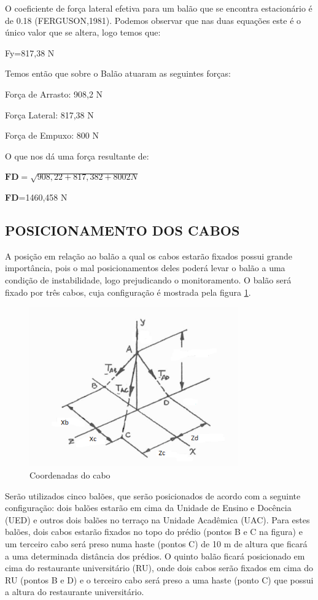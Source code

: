 	O coeficiente de força lateral efetiva para um balão que se encontra estacionário é de 0.18 (FERGUSON,1981). Podemos observar que nas duas equações este é o único valor que se altera, logo temos que:

	Fy=817,38 N

	Temos então que sobre o Balão atuaram as seguintes forças:

	Força de Arrasto: 908,2 N

	Força Lateral: 817,38 N

	Força de Empuxo: 800 N

	O que nos dá uma força resultante de:

	$\textbf{FD}= \sqrt{908,22+ 817,382+8002N}$

	\textbf{FD}=1460,458 N

\subsection{POSICIONAMENTO DOS CABOS}

	A posição em relação ao balão a qual os cabos estarão fixados possui grande importância, pois o mal posicionamentos deles poderá levar o balão a uma condição de instabilidade, logo prejudicando o monitoramento. O balão será fixado por três cabos, cuja  configuração é mostrada pela figura \ref{img:coordcabos}.

	\begin{figure}[H]
		\centering
		\includegraphics[width=0.8\textwidth]{figuras/coorcabo}
		\caption{Coordenadas do cabo \cite{beer}}
		\label{img:coordcabos}
	\end{figure}

	Serão utilizados cinco balões, que serão posicionados de acordo com a seguinte configuração: dois balões estarão em cima da Unidade de Ensino e Docência (UED) e outros dois balões no terraço na Unidade Acadêmica (UAC). Para estes balões, dois cabos estarão fixados no topo do prédio (pontos B e C na figura) e um terceiro cabo será preso numa haste (pontos C) de 10 m de altura que ficará a uma determinada distância dos prédios. O quinto balão ficará posicionado em cima do restaurante universitário (RU), onde dois cabos serão fixados em cima do RU (pontos B e D) e o terceiro cabo será preso a uma haste (ponto C) que possui a altura do restaurante universitário.

